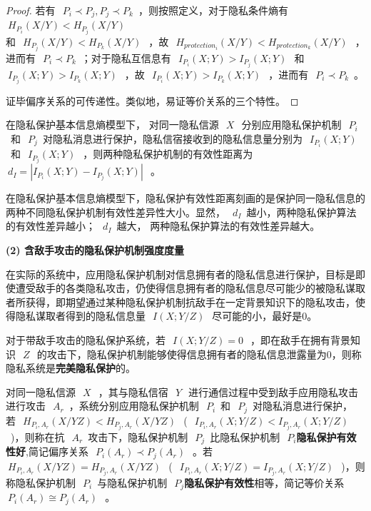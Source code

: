\begin{proof}
	若有~$~P_{i}\prec P_{j},P_{j}\prec P_{k}$~，则按照定义，对于隐私条件熵有~$~H_{P_{i}}(X/Y)< H_{P_{j}}(X/Y)~$\\和~$~H_{P_{j}}(X/Y)< H_{P_{k}}(X/Y)~$~，故~$~H_{protection_{i}}(X/Y)< H_{protection_{k}}(X/Y)~$~，进而有~$~P_{i}\prec P_{k}$~；对于隐私互信息有~$~I_{P_{i}}(X;Y)>I_{P_{j}}(X;Y)~$~和~$~I_{P_{j}}(X;Y)>I_{P_{k}}(X;Y)~$~，故~$~I_{P_{i}}(X;Y)>I_{P_{k}}(X;Y)~$~，进而有~$~P_{i}\prec P_{k}$~。
	
	证毕偏序关系的可传递性。类似地，易证等价关系的三个特性。
\end{proof}


\begin{definition}[隐私保护有效性距离]
	\label{def:privacy-preserving-distance} 
	在隐私保护基本信息熵模型下， 对同一隐私信源~$~X~$~分别应用隐私保护机制~$~P_{i}$~和~$~P_{j}$~对隐私消息进行保护，隐私信宿接收到的隐私信息量分别为~$~I_{P_{i}}(X;Y)~$~和~$~I_{P_{j}}(X;Y)~$~，则两种隐私保护机制的有效性距离为~$~d_{I}=\left | I_{P_{i}}(X;Y)-I_{P_{j}}(X;Y) \right |~$~。
\end{definition}

在隐私保护基本信息熵模型下，隐私保护有效性距离刻画的是保护同一隐私信息的两种不同隐私保护机制有效性差异性大小。显然，~$~d_{I}$~越小，两种隐私保护算法的有效性差异越小；~$~d_{I}$~越大， 两种隐私保护算法的有效性差异越大。

\textbf{(2) 含敌手攻击的隐私保护机制强度度量}

在实际的系统中，应用隐私保护机制对信息拥有者的隐私信息进行保护，目标是即使遭受敌手的各类隐私攻击，仍使得信息拥有者的隐私信息尽可能少的被隐私谋取者所获得，即期望通过某种隐私保护机制抗敌手在一定背景知识下的隐私攻击，使得隐私谋取者得到的隐私信息量~$~I(X;Y/Z)~$~尽可能的小，最好是0。

\begin{definition}
	\label{def:perfect-privacy-preserving}
	 对于带敌手攻击的隐私保护系统，若~$~I(X;Y/Z)=0~$~，即在敌手在拥有背景知识~$~Z~$~的攻击下，隐私保护机制能够使得信息拥有者的隐私信息泄露量为0，则称隐私系统是\textbf{完美隐私保护}的。
\end{definition}


\begin{definition}
	\label{def:privacy-preserving-performance}
	对同一隐私信源~$~X~$~，其与隐私信宿~$~Y~$~进行通信过程中受到敌手应用隐私攻击进行攻击~$~A_{r}$~，系统分别应用隐私保护机制~$~P_{i}$~和~$~P_{j}$~对隐私消息进行保护，若~$~H_{P_{i},A_{r}}(X/YZ)<H_{P_{j},A_{r}}(X/YZ)~$~(~$~I_{P_{i},A_{r}}(X;Y/Z)<I_{P_{j},A_{r}}(X;Y/Z)~$~)，则称在抗~$~A_{r}$~攻击下，隐私保护机制~$~P_{j}$~比隐私保护机制~$~P_{i}$\textbf{隐私保护有效性好},简记偏序关系~$~P_{i}(A_{r})\prec P_{j}(A_{r})~$~。若~$~H_{P_{i},A_{r}}(X/YZ)=H_{P_{j},A_{r}}(X/YZ)~$~(~$~I_{P_{i},A_{r}}(X;Y/Z)=I_{P_{j},A_{r}}(X;Y/Z)~$~)，则称隐私保护机制~$~P_{i}$~与隐私保护机制~$~P_{j}$\textbf{隐私保护有效性}相等，简记等价关系~$~P_{i}(A_{r})\cong P_{j}(A_{r})~$~。
\end{definition}

